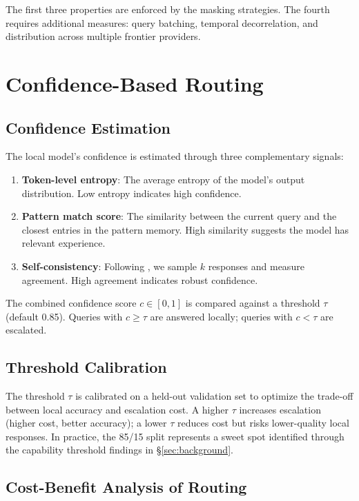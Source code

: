 \documentclass[11pt,a4paper]{article}
\begin{document}
The first three properties are enforced by the masking strategies. The fourth requires additional measures: query batching, temporal decorrelation, and distribution across multiple frontier providers.

\section{Confidence-Based Routing}
\label{sec:routing}

\subsection{Confidence Estimation}

The local model's confidence is estimated through three complementary signals:

\begin{enumerate}[leftmargin=2em]
    \item \textbf{Token-level entropy}: The average entropy of the model's output distribution. Low entropy indicates high confidence.
    \item \textbf{Pattern match score}: The similarity between the current query and the closest entries in the pattern memory. High similarity suggests the model has relevant experience.
    \item \textbf{Self-consistency}: Following \citet{wang2023selfconsistency}, we sample $k$ responses and measure agreement. High agreement indicates robust confidence.
\end{enumerate}

The combined confidence score $c \in [0, 1]$ is compared against a threshold $\tau$ (default 0.85). Queries with $c \geq \tau$ are answered locally; queries with $c < \tau$ are escalated.

\subsection{Threshold Calibration}

The threshold $\tau$ is calibrated on a held-out validation set to optimize the trade-off between local accuracy and escalation cost. A higher $\tau$ increases escalation (higher cost, better accuracy); a lower $\tau$ reduces cost but risks lower-quality local responses. In practice, the 85/15 split represents a sweet spot identified through the capability threshold findings in \S\ref{sec:background}.

\subsection{Cost-Benefit Analysis of Routing}
\end{document}
